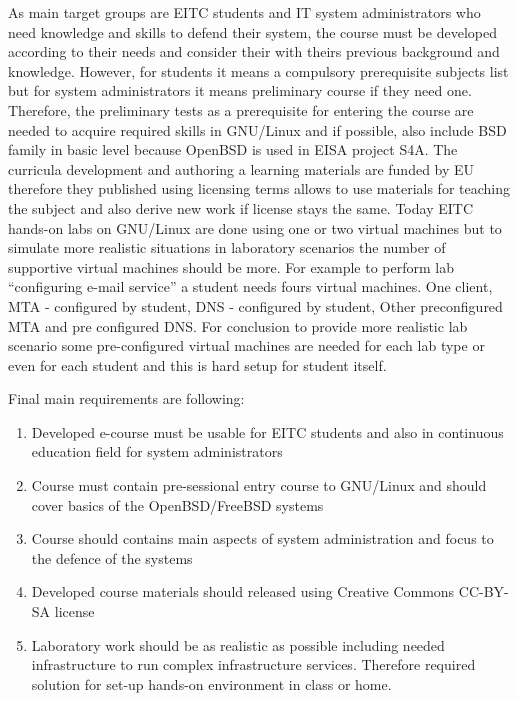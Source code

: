 As main target groups are \gls{EITC} students and IT system administrators who need knowledge and skills to defend their system, the course must be developed according to their needs and consider their with theirs previous background and knowledge. However, for students it means a compulsory prerequisite subjects list but for system administrators it means preliminary course if they need one. Therefore, the preliminary tests as a prerequisite for entering the course are needed to acquire required skills in GNU/Linux and if possible, also include \gls{BSD} family in basic level because OpenBSD is used in \gls{EISA} project S4A.
The curricula development and authoring a learning materials are funded by EU therefore they  published using licensing terms allows to use materials for teaching the subject and also derive new work if license stays the same.
Today EITC hands-on labs on GNU/Linux are done using one or two virtual machines but to simulate more realistic situations in laboratory scenarios the number of supportive virtual machines should be more. For example to perform lab “configuring e-mail service” a student needs fours virtual machines. One client, MTA - configured by student, DNS -  configured by student, Other preconfigured MTA and pre configured DNS. For conclusion to provide more realistic lab scenario some pre-configured virtual machines are needed for each lab type or even for each student and this is hard setup for student itself.

Final main requirements are following:
\begin{enumerate}[label=Requirement \arabic*.,leftmargin=*]
  \item Developed e-course must be usable for \gls{EITC} students and also in continuous education field for system administrators
  \item Course must contain pre-sessional entry course to GNU/Linux and should cover basics  of the OpenBSD/FreeBSD systems
  \item Course should contains main aspects of system administration and focus to the defence of the systems
  \item Developed course materials should released using Creative Commons \gls{CC-BY-SA} license
  \item Laboratory work should be as realistic as possible including needed infrastructure to run complex infrastructure services. Therefore required solution for set-up hands-on environment in class or home.
\end{enumerate}


